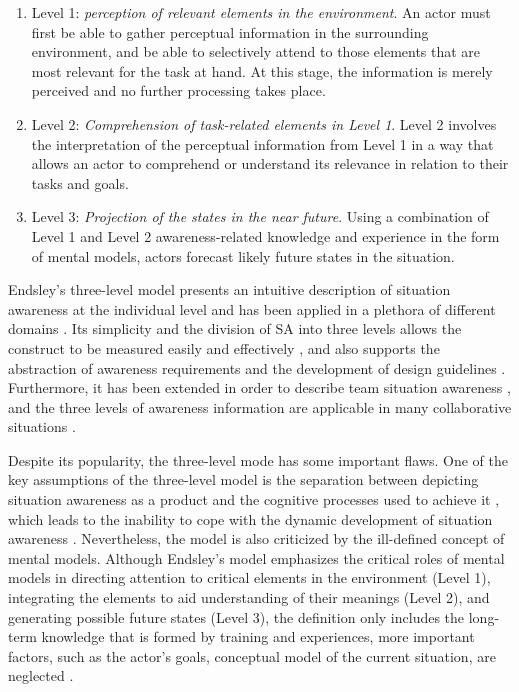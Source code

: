 \begin{enumerate}
	\item Level 1: \emph{perception of relevant elements in the environment}. An actor must first be able to gather perceptual information in the surrounding environment, and be able to selectively attend to those elements that are most relevant for the task at hand. At this stage, the information is merely perceived and no further processing takes place. 
	\item Level 2: \emph{Comprehension of task-related elements in Level 1}. Level 2 involves the interpretation of the perceptual information from Level 1 in a way that allows an actor to comprehend or understand its relevance in relation to their tasks and goals.
	\item Level 3: \emph{Projection of the states in the near future}. Using a combination of Level 1 and Level 2 awareness-related knowledge and experience in the form of mental models, actors forecast likely future states in the situation.
\end{enumerate}

Endsley's three-level model presents an intuitive description of situation awareness at the individual level and has been applied in a plethora of different domains \cite{Wickens2008}. Its simplicity and the division of SA into three levels allows the construct to be measured easily and effectively \cite{endsley1995measurement}, and also supports the abstraction of awareness requirements and the development of design guidelines \cite{Salmon2008}. Furthermore, it has been extended in order to describe team situation awareness \cite{endsley2001model}, and the three levels of awareness information are applicable in many collaborative situations \cite{Gutwin2002}.

Despite its popularity, the three-level mode has some important flaws. One of the key assumptions of the three-level model is the separation between depicting situation awareness as a product and the cognitive processes used to achieve it \cite{Salmon2008}, which leads to the inability to cope with the dynamic development of situation awareness \cite{Smith1995,uhlarik2002review}. Nevertheless, the model is also criticized by the ill-defined concept of mental models. Although Endsley's model emphasizes the critical roles of mental models in directing attention to critical elements in the environment (Level 1), integrating the elements to aid understanding of their meanings (Level 2), and generating possible future states (Level 3), the definition only includes the long-term knowledge that is formed by training and experiences, more important factors, such as the actor's goals, conceptual model of the current situation, are neglected \cite{Bedny1999}.

